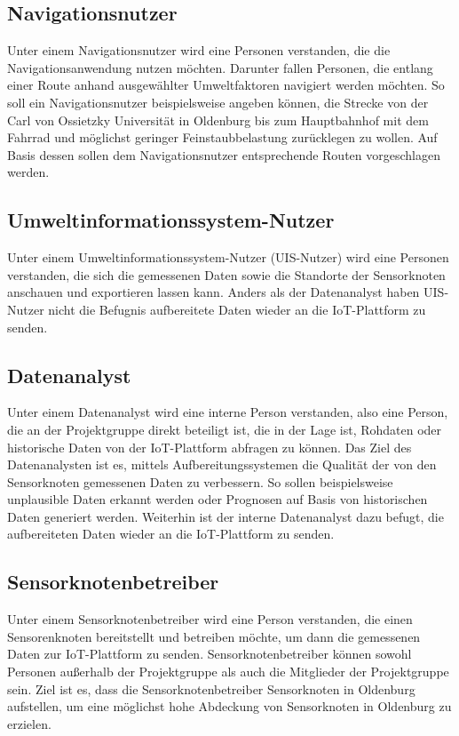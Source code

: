 \subsection{Navigationsnutzer} \label{navigation}
Unter einem Navigationsnutzer wird eine Personen verstanden, die die Navigationsanwendung nutzen möchten. Darunter fallen Personen, die entlang einer Route anhand ausgewählter Umweltfaktoren navigiert werden möchten. So soll ein Navigationsnutzer beispielsweise angeben können, die Strecke von der Carl von Ossietzky Universität in Oldenburg bis zum Hauptbahnhof mit dem Fahrrad und möglichst geringer Feinstaubbelastung zurücklegen zu wollen. Auf Basis dessen sollen dem Navigationsnutzer entsprechende Routen vorgeschlagen werden.

\subsection{Umweltinformationssystem-Nutzer} \label{UIS}
Unter einem Umweltinformationssystem-Nutzer (UIS-Nutzer) wird eine Personen verstanden, die sich die gemessenen Daten sowie die Standorte der Sensorknoten anschauen und exportieren lassen kann. Anders als der Datenanalyst haben UIS-Nutzer nicht die Befugnis aufbereitete Daten wieder an die IoT-Plattform zu senden. 

\subsection{Datenanalyst} \label{datenanalyst}
Unter einem Datenanalyst wird eine interne Person verstanden, also eine Person, die an der Projektgruppe direkt beteiligt ist, die in der Lage ist, Rohdaten oder historische Daten von der IoT-Plattform abfragen zu können. Das Ziel des Datenanalysten ist es, mittels Aufbereitungssystemen die Qualität der von den Sensorknoten gemessenen Daten zu verbessern. So sollen beispielsweise unplausible Daten erkannt werden oder Prognosen auf Basis von historischen Daten generiert werden. Weiterhin ist der interne Datenanalyst dazu befugt, die aufbereiteten Daten wieder an die IoT-Plattform zu senden.

\subsection{Sensorknotenbetreiber} \label{sensor}
Unter einem Sensorknotenbetreiber wird eine Person verstanden, die einen Sensorenknoten bereitstellt und betreiben möchte, um dann die gemessenen Daten zur IoT-Plattform zu senden. Sensorknotenbetreiber können sowohl Personen außerhalb der Projektgruppe als auch die Mitglieder der Projektgruppe sein. Ziel ist es, dass die Sensorknotenbetreiber Sensorknoten in Oldenburg aufstellen, um eine möglichst hohe Abdeckung von Sensorknoten in Oldenburg zu erzielen.

